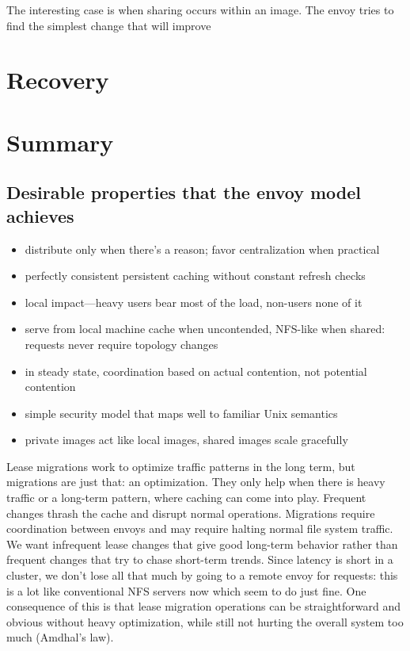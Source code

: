 The interesting case is when sharing occurs within an image. The envoy tries to find the simplest change that will improve 

\section{Recovery}



\section{Summary}

\subsection{Desirable properties that the envoy model achieves}
\begin{itemize}
\item distribute only when there's a reason; favor centralization when practical
\item perfectly consistent persistent caching without constant refresh checks
\item local impact---heavy users bear most of the load, non-users none of it
\item serve from local machine cache when uncontended, NFS-like when shared: requests never require topology changes
\item in steady state, coordination based on actual contention, not potential contention
\item simple security model that maps well to familiar Unix semantics
\item private images act like local images, shared images scale gracefully
\end{itemize}

Lease migrations work to optimize traffic patterns in the long term, but migrations are just that: an optimization. They only help when there is heavy traffic or a long-term pattern, where caching can come into play. Frequent changes thrash the cache and disrupt normal operations. Migrations require coordination between envoys and may require halting normal file system traffic. We want infrequent lease changes that give good long-term behavior rather than frequent changes that try to chase short-term trends. Since latency is short in a cluster, we don't lose all that much by going to a remote envoy for requests: this is a lot like conventional NFS servers now which seem to do just fine. One consequence of this is that lease migration operations can be straightforward and obvious without heavy optimization, while still not hurting the overall system too much (Amdhal's law).
